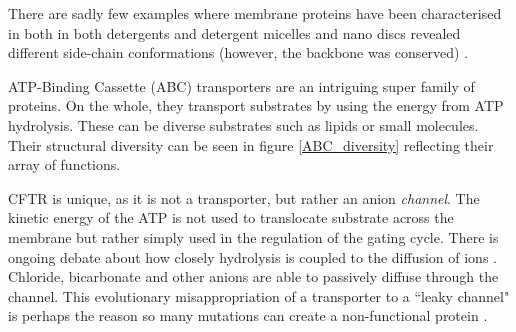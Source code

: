 There are sadly few examples where membrane proteins have been characterised in both in both detergents and detergent micelles and nano discs revealed different side-chain conformations (however, the backbone was conserved) \cite{autzen2019, gao2016, cheng2015}. 



ATP-Binding Cassette (ABC) transporters are an intriguing super family of proteins. On the whole, they transport substrates by using the energy from ATP hydrolysis. These can be diverse substrates such as lipids or small molecules. Their structural diversity can be seen in figure \ref{ABC_diversity} reflecting their array of functions. 

CFTR is unique, as it is not a transporter, but rather an anion \textit{channel}. The kinetic energy of the ATP is not used to translocate substrate across the membrane but rather simply used in the regulation of the gating cycle. There is ongoing debate about how closely hydrolysis is coupled to the diffusion of ions \cite{}. Chloride, bicarbonate and other anions are able to passively diffuse through the channel. This evolutionary misappropriation of a transporter to a ``leaky channel" is perhaps the reason so many mutations can create a non-functional protein \cite{depristo2005,linsdell2018}.

